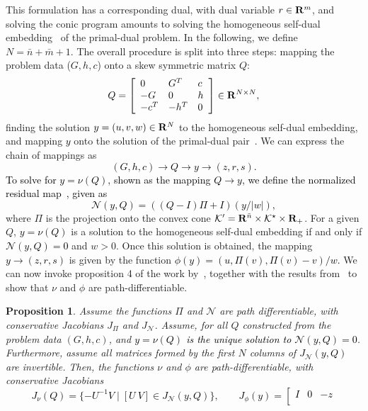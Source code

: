 \documentclass[11pt]{article}
\newtheorem{proposition}{Proposition}[section]
\newcommand{\bsnote}[1]{\noindent\textcolor{red}{\texttt{Bartolomeo: #1}}}
\newcommand{\RC}[1]{\textcolor{black}{#1}}
\begin{document}
\begin{appendices}
This formulation has a corresponding dual, with dual variable $r \in \reals^{m}$, and solving the conic program amounts to solving the homogeneous self-dual embedding~\citep{cones-hist}
of the primal-dual problem. 
In the following, we define $N = \bar{n} +  \bar{m} + 1$. The overall procedure is split into three steps: mapping the problem data ($G,h,c$) onto a skew symmetric matrix $Q$:
$$Q =  
\left[\begin{array}{lll} 0 & G^T & c\\
	-G & 0 & h \\
-c^T & -h^T & 0\end{array} \right] \in \reals^{N\times N},$$
finding the solution \RC{$y = (u,v,w) \in \reals^N$} to the homogeneous self-dual embedding, and mapping \RC{$y$} onto the solution of the primal-dual pair~\citep{diffcp2019}. We can express the chain of mappings as 
\RC{$$(G,h,c) \rightarrow Q \rightarrow y \rightarrow (z,r,s).$$
To solve for $y= \nu(Q)$, shown as the mapping $Q \rightarrow y$, we define the normalized residual map~\citep{cones}, given as
$$\mathcal{N}(y,Q) = ((Q-I)\Pi + I)(y/|w|),$$}
where $\Pi$ is the projection onto the convex cone $\mathcal{K}' = \reals^{\bar{n}} \times \mathcal{K}^\star \times \reals_+$.
For a given $Q$, \RC{$y = \nu(Q)$} is a solution to the homogeneous self-dual embedding if and only if \RC{$\mathcal{N}(y,Q) =0$} and $w> 0$.
Once this solution is obtained, the mapping \RC{$y \rightarrow (z,r,s)$ }is given by the function 
\RC{$ \phi(y) = (u, \Pi(v), \Pi(v) - v)/w. $}
We can now invoke proposition 4 of the work by~\cite{path-diff}, together with the results from~\cite{diffcp2019} to show that $\nu$ and $\phi$ are path-differentiable. 
\begin{proposition}
    Assume the functions $\Pi$ and $\mathcal{N}$ are path differentiable, with conservative Jacobians $J_\Pi$ and $J_\mathcal{N}$.  Assume, for all $Q$ constructed from the problem data $(G,h,c)$, and \RC{$y = \nu(Q) $ is the unique solution to $\mathcal{N}(y,Q)=0$}. Furthermore, assume all matrices formed by the first $N$ columns of \RC{$J_\mathcal{N}(y,Q)$} are invertible. Then, the functions $\nu$ and $\phi$ are path-differentiable, with conservative Jacobians
    \RC{$$J_\nu(Q) = \{-U^{-1}V \mid [U~V] \in J_\mathcal{N}(y,Q)\},\qquad J_\phi(y) = \left[\begin{array}{ccc} I & 0 & -z\\

\end{array}$$}
\end{proposition}
\end{appendices}
\end{document}
